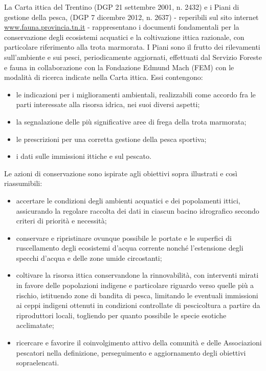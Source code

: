 \documentclass[10pt,twoside,openany,x11names,svgnames,italian,a5paper,dvipsnames,table]{memoir}
\begin{document}
La Carta ittica del Trentino (DGP 21 settembre 2001, n. 2432) e i Piani di gestione della pesca, (DGP 7 dicembre 2012, n. 2637) - reperibili sul sito internet \url{www.fauna.provincia.tn.it} - rappresentano i documenti fondamentali per la conservazione degli ecosistemi acquatici e la coltivazione ittica razionale, con particolare riferimento alla trota marmorata.
I Piani sono il frutto dei rilevamenti sull’ambiente e sui pesci, periodicamente aggiornati, effettuati dal Servizio Foreste e fauna in collaborazione con la Fondazione Edmund Mach (FEM) con le modalità di ricerca indicate nella Carta ittica. Essi contengono:
\begin{itemize}\itemsep0pt
\item le indicazioni per i miglioramenti ambientali, realizzabili come accordo fra le parti interessate alla risorsa idrica, nei suoi diversi aspetti;
\item la segnalazione delle più significative aree di frega della trota marmorata; 
\item le prescrizioni per una corretta gestione della pesca sportiva;
\item i dati sulle immissioni ittiche e sul pescato.
\end{itemize}
Le azioni di conservazione sono ispirate agli obiettivi sopra illustrati e così riassumibili:
\begin{itemize}\itemsep0pt
\item accertare le condizioni degli ambienti acquatici e dei popolamenti ittici, assicurando la regolare raccolta dei dati in ciascun bacino idrografico secondo criteri di priorità e necessità;
\item conservare e ripristinare ovunque possibile le portate e le superfici di ruscellamento degli ecosistemi d’acqua corrente nonché l’estensione degli specchi d’acqua e delle zone umide circostanti;
\item coltivare la risorsa ittica conservandone la rinnovabilità, con interventi mirati in favore delle popolazioni indigene e particolare riguardo verso quelle più a rischio, istituendo zone di bandita di pesca, limitando le eventuali immissioni ai ceppi indigeni ottenuti in condizioni controllate di pescicoltura a partire da riproduttori locali, togliendo per quanto possibile le specie esotiche acclimatate;
\item ricercare e favorire il coinvolgimento attivo della comunità e delle Associazioni pescatori nella definizione, perseguimento e aggiornamento degli obiettivi sopraelencati.
\end{itemize}  
\end{document}
